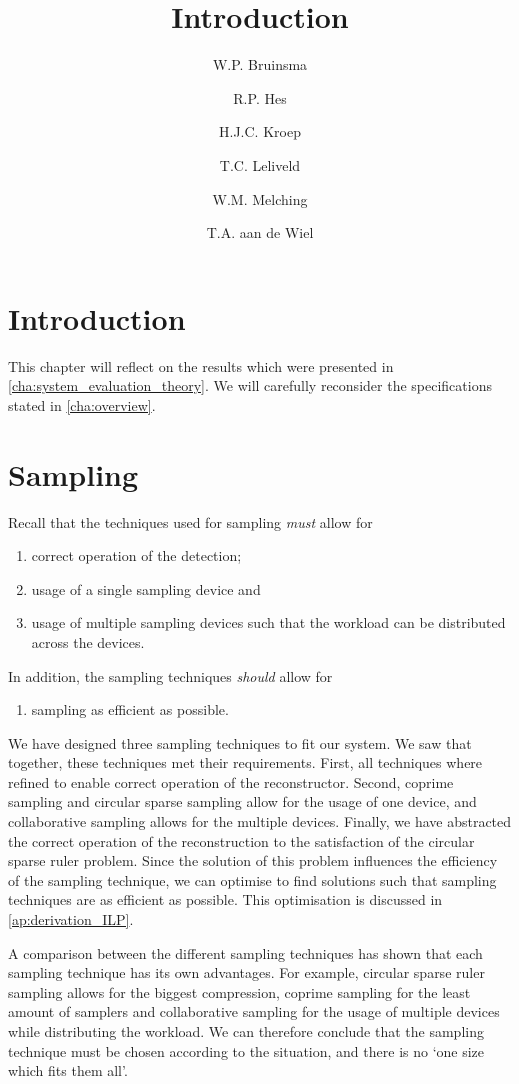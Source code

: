 \documentclass[a4paper, openany, oneside]{memoir}
\title{Introduction}
\author{W.P. Bruinsma \and R.P. Hes \and H.J.C. Kroep \and T.C. Leliveld \and W.M. Melching \and T.A. aan de Wiel}
\begin{document}
\section{Introduction}
This chapter will reflect on the results which were presented in \cref{cha:system_evaluation_theory}. We will carefully reconsider the specifications stated in \cref{cha:overview}.

\section{Sampling}
Recall that the techniques used for sampling \emph{must} allow for
\begin{enumerate}
    \item correct operation of the detection;
    \item usage of a single sampling device and
    \item usage of multiple sampling devices such that the workload can be distributed across the devices.
\end{enumerate}
In addition, the sampling techniques \emph{should} allow for
\begin{enumerate}
    \item sampling as efficient as possible.
\end{enumerate}

We have designed three sampling techniques to fit our system. We saw that together, these techniques met their requirements. First, all techniques where refined to enable correct operation of the reconstructor. Second, coprime sampling and circular sparse sampling allow for the usage of one device, and collaborative sampling allows for the multiple devices. Finally, we have abstracted the correct operation of the reconstruction to the satisfaction of the circular sparse ruler problem. Since the solution of this problem influences the efficiency of the sampling technique, we can optimise to find solutions such that sampling techniques are as efficient as possible. This optimisation is discussed in \cref{ap:derivation_ILP}.

A comparison between the different sampling techniques has shown that each sampling technique has its own advantages. For example, circular sparse ruler sampling allows for the biggest compression, coprime sampling for the least amount of samplers and collaborative sampling for the usage of multiple devices while distributing the workload. We can therefore conclude that the sampling technique must be chosen according to the situation, and there is no `one size which fits them all'. 
\end{document}
